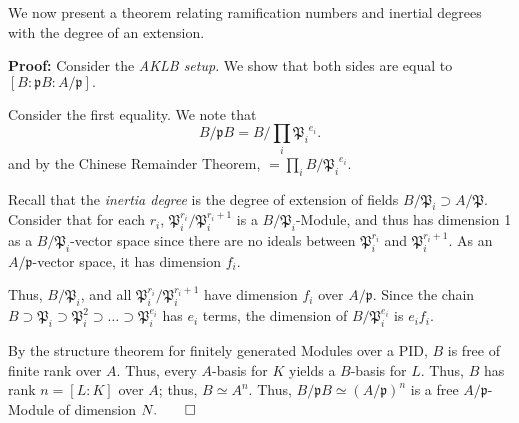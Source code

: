 \documentclass[a4paper, 12pt,oneside,openany]{book}
\begin{document}

We now present a theorem relating ramification numbers and inertial degrees with the degree of an extension.


\textbf{Proof:} Consider the \emph{AKLB setup}. We show that both sides are equal to $[B:\mathfrak{p}B:A/\mathfrak{p}].$

Consider the first equality. We note that
    $$B/\mathfrak{p}B = B / \prod\limits_i {\mathfrak{P}_i}^{e_i}.$$
and by the Chinese Remainder Theorem, $=\prod\limits_i B/{\mathfrak{P}_i}^{e_i}.$

Recall that the \emph{inertia degree} is the degree of extension of fields $B/\mathfrak{P}_i \supset A/\mathfrak{P}$. Consider that for each $r_i$, $\mathfrak{P}_i^{r_i} / \mathfrak{P}_i^{r_i+1}$ is a $B/\mathfrak{P}_i$-Module, and thus has dimension 1 as a $B/\mathfrak{P}_i$-vector space since there are no ideals between $\mathfrak{P}_i^{r_i}$ and $\mathfrak{P}_i^{r_i+1}.$ As an $A/\mathfrak{p}$-vector space, it has dimension $f_i.$ 

Thus, $B/\mathfrak{P}_i$, and all $\mathfrak{P}_i^{r_i}/\mathfrak{P}_i^{r_i+1}$ have dimension $f_i$ over $A/\mathfrak{p}.$ Since the chain $B \supset \mathfrak{P}_i \supset \mathfrak{P}_i^2 \supset \dots \supset \mathfrak{P}_i^{e_i}$ has $e_i$ terms, the dimension of $B/\mathfrak{P}_i^{e_i}$ is $e_if_i.$

By the structure theorem for finitely generated Modules over a PID, $B$ is free of finite rank over $A.$ Thus, every $A$-basis for $K$ yields a $B$-basis for $L$.  Thus, $B$ has rank $n=[L:K]$ over $A$;  thus, $B \simeq A^n.$  Thus, $B/\mathfrak{p}B \simeq (A/\mathfrak{p})^n$ is a free  $A/\mathfrak{p}$-Module of dimension $N. \qed$ 
\end{document}

